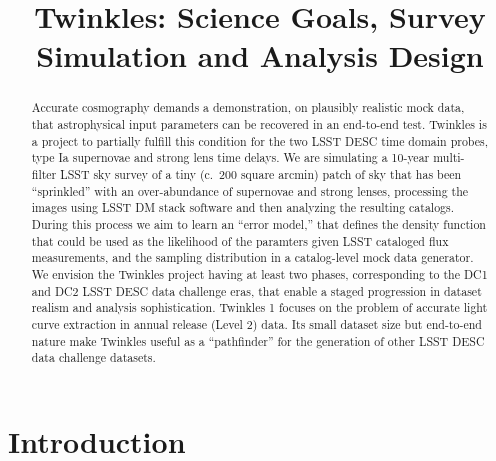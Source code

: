 \documentclass[\docopts]{\docclass}
\begin{document}
\title{ Twinkles: Science Goals, Survey Simulation and Analysis Design }

\maketitlepre

\begin{abstract}

Accurate cosmography demands a demonstration, on plausibly realistic mock data, that astrophysical input parameters can be recovered in an end-to-end test.
Twinkles is a project to partially fulfill this condition for the two LSST DESC time domain probes, type Ia supernovae and strong lens time delays.
We are simulating a 10-year multi-filter LSST sky survey of a tiny (c.\ 200 square arcmin) patch of sky that has been ``sprinkled'' with an over-abundance of supernovae and strong lenses, processing the images using LSST DM stack software and then analyzing the resulting catalogs.
During this process we aim to learn an ``error model,'' that defines the density function that could be used as the likelihood of the paramters given LSST cataloged flux measurements, and the sampling distribution in a catalog-level mock data generator.
We envision the Twinkles project having at least two phases, corresponding to the DC1 and DC2 LSST DESC data challenge eras, that  enable a staged progression in dataset realism and analysis sophistication.
Twinkles 1 focuses on the problem of accurate light curve extraction in annual release (Level 2) data.
Its small dataset size but end-to-end nature make Twinkles useful as a ``pathfinder'' for the generation of other LSST DESC data challenge datasets.

\end{abstract}


\maketitlepost

%

\section{Introduction}
\label{sec:intro}
\end{document}
